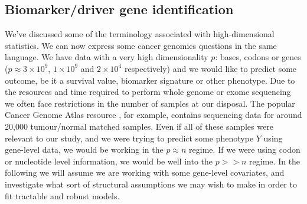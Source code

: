 \documentclass[thesis.tex]{subfiles}
\begin{document}
\subsection{Biomarker/driver gene identification}
We've discussed some of the terminology associated with high-dimensional statistics. We can now express some cancer genomics questions in the same language. We have data with a very high dimensionality $p$: bases, codons or genes ($p \approx 3\times 10^9$, $1 \times 10^9$ and $2 \times 10^4$ respectively) and we would like to predict some outcome, be it a survival value, biomarker signature or other phenotype. Due to the resources and time required to perform whole genome or exome sequencing we often face restrictions in the number of samples at our disposal. The popular Cancer Genome Atlas resource \citep{weinstein_cancer_2013}, for example, contains sequencing data for around 20,000 tumour/normal matched samples. Even if all of these samples were relevant to our study, and we were trying to predict some phenotype $Y$ using gene-level data, we would be working in the $p \approx n$ regime. If we were using codon or nucleotide level information, we would be well into the $p >> n$ regime. In the following we will assume we are working with some gene-level covariates, and investigate what sort of structural assumptions we may wish to make in order to fit tractable and robust models. 
\end{document}
